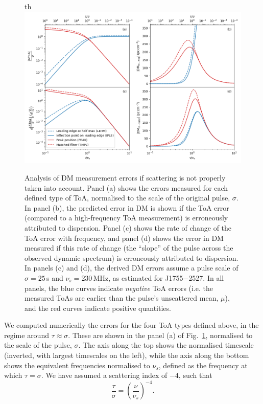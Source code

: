 \documentclass[fleqn,usenatbib]{mnras}
\newcommand{\src}{J1755$-$2527}
\newcommand{\Fig}{Fig.}
\begin{document}
\begin{figure}{th}
    \centering
    \includegraphics[width=0.98\linewidth]{scattering_DM.png}
    \caption{Analysis of DM measurement errors if scattering is not properly taken into account. Panel (a) shows the errors measured for each defined type of ToA, normalised to the scale of the original pulse, $\sigma$. In panel (b), the predicted error in DM is shown if the ToA error (compared to a high-frequency ToA measurement) is erroneously attributed to dispersion. Panel (c) shows the rate of change of the ToA error with frequency, and panel (d) shows the error in DM measured if this rate of change (the ``slope'' of the pulse across the observed dynamic spectrum) is erroneously attributed to dispersion. In panels (c) and (d), the derived DM errors assume a pulse scale of $\sigma = 25\,$s and $\nu_s = 230\,$MHz, as estimated for \src{}. In all panels, the blue curves indicate \emph{negative} ToA errors (i.e. the measured ToAs are earlier than the pulse's unscattered mean, $\mu$), and the red curves indicate positive quantities.}
    \label{fig:scattering_DM}
\end{figure}

We computed numerically \citep[using SciPy's \texttt{root} function;][]{2020NatMe..17..261V} the errors for the four ToA types defined above, in the regime around $\tau \approx \sigma$.
These are shown in the panel (a) of \Fig~\ref{fig:scattering_DM}, normalised to the scale of the pulse, $\sigma$.
The axis along the top shows the normalised timescale (inverted, with largest timescales on the left), while the axis along the bottom shows the equivalent frequencies normalised to $\nu_s$, defined as the frequency at which $\tau = \sigma$.
We have assumed a scattering index of $-4$, such that
\begin{equation}
    \frac{\tau}{\sigma} = \left(\frac{\nu}{\nu_s}\right)^{-4}.
\end{equation}
\end{document}
